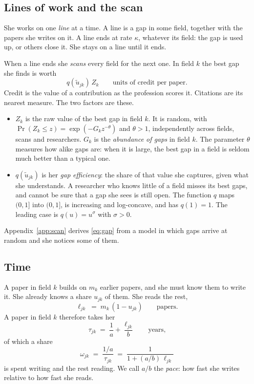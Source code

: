 \documentclass[11pt,letterpaper]{article}
\newcommand{\ut}{\tilde u}
\begin{document}
\subsection{Lines of work and the scan}

She works on one \emph{line} at a time. A line is a gap in some field, together with the papers she writes on it. A line ends at rate $\kappa$, whatever its field: the gap is used up, or others close it. She stays on a line until it ends.

When a line ends she \emph{scans} every field for the next one. In field $k$ the best gap she finds is worth
\begin{equation}\label{eq:gap}
q(\ut_{jk})\,Z_k \qquad\text{units of credit per paper.}
\end{equation}
Credit is the value of a contribution as the profession scores it. Citations are its nearest measure. The two factors are these.
\begin{itemize}
\item $Z_k$ is the raw value of the best gap in field $k$. It is random, with $\Pr(Z_k\le z)=\exp(-G_k z^{-\theta})$ and $\theta>1$, independently across fields, scans and researchers. $G_k$ is the \emph{abundance of gaps} in field $k$. The parameter $\theta$ measures how alike gaps are: when it is large, the best gap in a field is seldom much better than a typical one.
\item $q(\ut_{jk})$ is her \emph{gap efficiency}: the share of that value she captures, given what she understands. A researcher who knows little of a field misses its best gaps, and cannot be sure that a gap she sees is still open. The function $q$ maps $(0,1]$ into $(0,1]$, is increasing and log-concave, and has $q(1)=1$. The leading case is $q(u)=u^{\sigma}$ with $\sigma>0$.
\end{itemize}
Appendix~\ref{app:scan} derives \eqref{eq:gap} from a model in which gaps arrive at random and she notices some of them.

\subsection{Time}

A paper in field $k$ builds on $m_k$ earlier papers, and she must know them to write it. She already knows a share $u_{jk}$ of them. She reads the rest,
\begin{equation}\label{eq:ell}
\ell_{jk}\;=\;m_k\,(1-u_{jk})\qquad\text{papers.}
\end{equation}
A paper in field $k$ therefore takes her
\begin{equation}\label{eq:tau}
\tau_{jk}\;=\;\frac1a+\frac{\ell_{jk}}{b}\qquad\text{years,}
\end{equation}
of which a share
\begin{equation}\label{eq:omega}
\omega_{jk}\;=\;\frac{1/a}{\tau_{jk}}\;=\;\frac{1}{1+(a/b)\,\ell_{jk}}
\end{equation}
is spent writing and the rest reading. We call $a/b$ the \emph{pace}: how fast she writes relative to how fast she reads.
\end{document}
